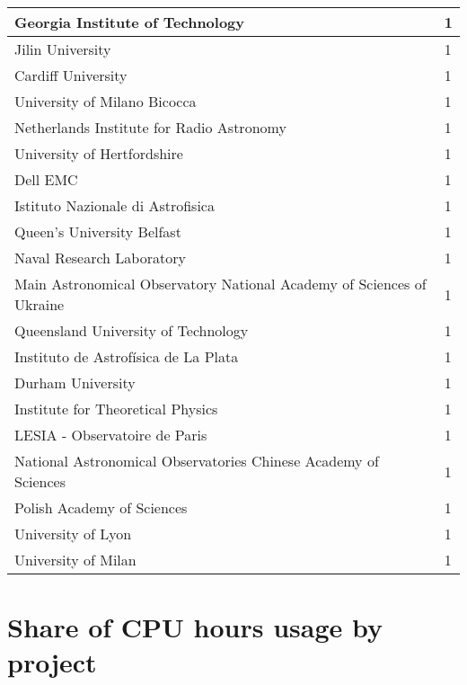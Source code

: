 \documentclass{article}%
\begin{document}
\begin{longtabu}{X[l] X[r]}
\hline%
Georgia Institute of Technology&1\\%
\hline%
Jilin University&1\\%
\hline%
Cardiff University&1\\%
\hline%
University of Milano Bicocca&1\\%
\hline%
Netherlands Institute for Radio Astronomy&1\\%
\hline%
University of Hertfordshire&1\\%
\hline%
Dell EMC&1\\%
\hline%
Istituto Nazionale di Astrofisica&1\\%
\hline%
Queen's University Belfast&1\\%
\hline%
Naval Research Laboratory&1\\%
\hline%
Main Astronomical Observatory National Academy of Sciences of Ukraine&1\\%
\hline%
Queensland University of Technology&1\\%
\hline%
Instituto de Astrofísica de La Plata&1\\%
\hline%
Durham University&1\\%
\hline%
Institute for Theoretical Physics&1\\%
\hline%
LESIA {-} Observatoire de Paris&1\\%
\hline%
National Astronomical Observatories Chinese Academy of Sciences&1\\%
\hline%
Polish Academy of Sciences&1\\%
\hline%
University of Lyon&1\\%
\hline%
University of Milan&1\\%
\hline%
\end{longtabu}%
\section{Share of CPU hours usage by project}%
\end{document}
